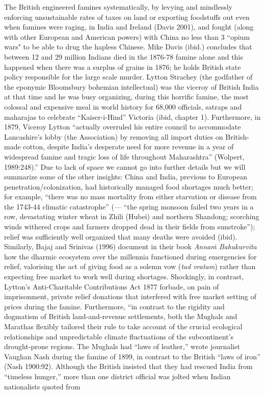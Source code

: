 The British engineered famines systematically, by levying and mindlessly enforcing unsustainable rates of taxes on land or exporting foodstuffs out even when famines were raging, in India and Ireland (Davis 2001), and fought (along with other European and American powers) with China no less than 3 ``opium wars" to be able to drug the hapless Chinese. Mike Davis (ibid.) concludes that between 12 and 29 million Indians died in the 1876-78 famine alone and this happened when there was a surplus of grains in 1876; he holds British state policy responsible for the large scale murder. Lytton Strachey (the godfather of the eponymic Bloomsbury bohemian intellectual) was the viceroy of British India at that time and he was busy organizing, during this horrific famine, the most colossal and expensive meal in world history for 68,000 officials, satraps and maharajas to celebrate “Kaiser-i-Hind” Victoria (ibid, chapter 1). Furthermore, in 1879, Viceroy Lytton “actually overruled his entire council to accommodate Lancashire’s lobby (the Association) by removing all import duties on British-made cotton, despite India’s desperate need for more revenue in a year of widespread famine and tragic loss of life throughout Maharashtra” (Wolpert, 1989:248).” Due to lack of space we cannot go into further details but we will summarize some of the other insights: China and India, previous to European penetration/colonization, had historically managed food shortages much better; for example, “there was no mass mortality from either starvation or disease from the 1743-44 climatic catastrophe” (--- “the spring monsoon failed two years in a row, devastating winter wheat in Zhili (Hubei) and northern Shandong; scorching winds withered crops and farmers dropped dead in their fields from sunstroke”); relief was sufficiently well organized that many deaths were avoided (ibid). Similarly, Bajaj and Srinivas (1996) document in their book {\sl Annaṁ Bahukurvīta} how the dharmic ecosystem over the millennia  functioned during emergencies for relief, valorising the act of giving food as a solemn vow ({\sl tad vratam}) rather than expecting free market to work well during shortages. Shockingly, in contrast, Lytton's Anti-Charitable Contributions Act 1877 forbade, on pain of imprisonment, private relief donations that interfered with free market setting of prices during the famine.  Furthermore, “in contrast to the rigidity and dogmatism of British land-and-revenue settlements, both the Mughals and Marathas flexibly tailored their rule to take account of the crucial ecological relationships and unpredictable climate fluctuations of the subcontinent’s drought-prone regions. The Mughals had “laws of leather,” wrote journalist Vaughan Nash during the famine of 1899, in contrast to the British “laws of iron” (Nash 1900:92). Although the British insisted that they had rescued India from “timeless hunger,” more than one district official was jolted when Indian nationalists quoted from 